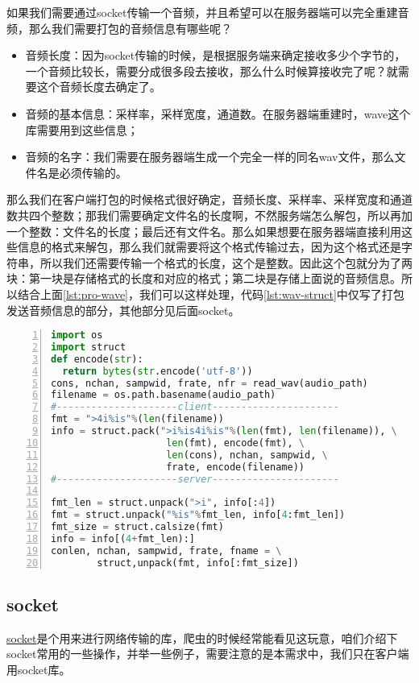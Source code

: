 如果我们需要通过socket传输一个音频，并且希望可以在服务器端可以完全重建音频，那么我们需要打包的音频信息有哪些呢？
\begin{itemize}
  \item 音频长度：因为socket传输的时候，是根据服务端来确定接收多少个字节的，一个音频比较长，需要分成很多段去接收，那么什么时候算接收完了呢？就需要这个音频长度去确定了。
  \item 音频的基本信息：采样率，采样宽度，通道数。在服务器端重建时，wave这个库需要用到这些信息；
  \item 音频的名字：我们需要在服务器端生成一个完全一样的同名wav文件，那么文件名是必须传输的。 
\end{itemize}

那么我们在客户端打包的时候格式很好确定，音频长度、采样率、采样宽度和通道数共四个整数；那我们需要确定文件名的长度啊，不然服务端怎么解包，所以再加一个整数：文件名的长度；最后还有文件名。那么如果想要在服务器端直接利用这些信息的格式来解包，那么我们就需要将这个格式传输过去，因为这个格式还是字符串，所以我们还需要传输一个格式的长度，这个是整数。因此这个包就分为了两块：第一块是存储格式的长度和对应的格式；第二块是存储上面说的音频信息。所以结合上面\ref{lst:pro-wave}，我们可以这样处理，代码\ref{lst:wav-struct}中仅写了打包发送音频信息的部分，其他部分见后面socket。
\begin{lstlisting}[language = python, caption={struct打包音频信息和数据}, label={lst:wav-struct}, numbers=left, 
       numberstyle=\tiny,keywordstyle=\color{blue!70},
       commentstyle=\color{red!50!green!50!blue!50},frame=shadowbox,
       rulesepcolor=\color{red!20!green!20!blue!20},basicstyle=\ttfamily]
import os
import struct
def encode(str):
  return bytes(str.encode('utf-8'))
cons, nchan, sampwid, frate, nfr = read_wav(audio_path)
filename = os.path.basename(audio_path)
#---------------------client----------------------
fmt = ">4i%is"%(len(filename))
info = struct.pack(">i%is4i%is"%(len(fmt), len(filename)), \
                    len(fmt), encode(fmt), \
                    len(cons), nchan, sampwid, \
                    frate, encode(filename))
#---------------------server----------------------

fmt_len = struct.unpack(">i", info[:4])
fmt = struct.unpack("%is"%fmt_len, info[4:fmt_len])
fmt_size = struct.calsize(fmt)
info = info[(4+fmt_len):]
conlen, nchan, sampwid, frate, fname = \
        struct,unpack(fmt, info[:fmt_size])
\end{lstlisting}

\subsection{socket}
\href{https://docs.python.org/3/library/socket.html}{socket}是个用来进行网络传输的库，爬虫的时候经常能看见这玩意，咱们介绍下socket常用的一些操作，并举一些例子，需要注意的是本需求中，我们只在客户端用socket库。

